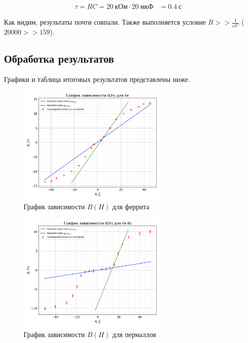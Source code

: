 \documentclass[a4paper, 12pt]{article}
\begin{document}
            \begin{align*}
                \tau = RC = 20~кОм \cdot 20~мкФ &= 0.4~с
            \end{align*}

            Как видим, результаты почти совпали. Также выполняется условие $R >> \frac{1}{\omega C}$ ($20000 >> 159$).

        \subsection{Обработка результатов}

            Графики и таблица итоговых результатов представлены ниже.

            \begin{figure}[!ht]
                \centering
                \includegraphics[width=0.65\textwidth]{img/plot_Fe.png}
                \caption{График зависимости $B(H)$ для феррита}
                \label{plot:Fe}
            \end{figure}

            \begin{figure}[!ht]
                \centering
                \includegraphics[width=0.65\textwidth]{img/plot_FeNi.png}
                \caption{График зависимости $B(H)$ для пермаллоя}
                \label{plot:FeNi}
            \end{figure}
\end{document}
